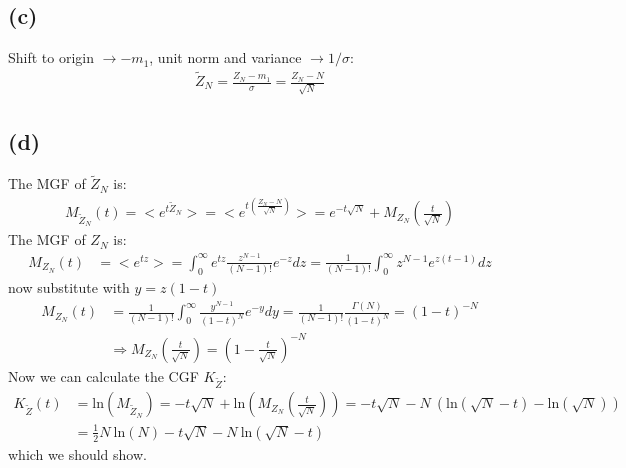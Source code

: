 \documentclass{article}
\begin{document}
\subsection*{(c)}
Shift to origin $\rightarrow -m_1$, unit norm and variance $\rightarrow 1/\sigma$:
    \begin{align}
        \tilde{Z}_N=\frac{Z_N-m_1}{\sigma}=\frac{Z_N-N}{\sqrt{N}}
    \end{align}
\subsection*{(d)}
The MGF of $\tilde{Z}_N$ is:
\begin{align}
    M_{\tilde{Z}_N}(t)=\big<{e^{t\tilde{Z}_N}}\big>=\Big<{e^{t\left(\frac{{Z}_N-N}{\sqrt{N}}\right)}}\Big>= e^{-t\sqrt{N}}+M_{Z_N}\left(\frac{t}{\sqrt{N}}\right)
\end{align}
The MGF of $Z_N$ is:
\begin{align}
    M_{Z_N}(t)&=\big<e^{tz}\big>= \int_0^\infty e^{tz} \frac{z^{N-1}}{(N-1)!}e^{-z} dz =\frac{1}{(N-1)!}\int_0^\infty z^{N-1}e^{z(t-1)} dz
    \end{align}
     now substitute with $y=z(1-t)$
    \begin{align}
    M_{Z_N}(t)&=\frac{1}{(N-1)!}\int_0^\infty \frac{y^{N-1}}{(1-t)^N}e^{-y} dy=\frac{1}{(N-1)!}\frac{\Gamma(N)}{(1-t)^N}=(1-t)^{-N}\\
    &\Rightarrow M_{Z_N}\left(\frac{t}{\sqrt{N}}\right)=\left(1-\frac{t}{\sqrt{N}}\right)^{-N}
\end{align}
Now we can calculate the CGF $ K_{\tilde{Z}}$:
\begin{align}
    K_{\tilde{Z}}(t)&= \text{ln}\left(M_{\tilde{Z}_N}\right)=-t\sqrt{N}+\text{ln}\left(M_{Z_N}\left(\frac{t}{\sqrt{N}}\right)\right)= -t\sqrt{N}-N\ \left(\text{ln}(\sqrt{N}-t)-\text{ln}(\sqrt{N})\right)\\
    &=\frac{1}{2}N\ \text{ln}(N)-t\sqrt{N}-N\ \text{ln}(\sqrt{N}-t)
\end{align}
which we should show.
\end{document}
